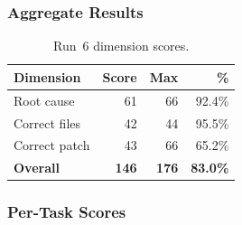 \subsubsection{Aggregate Results}

\begin{table}[h]
\centering
\caption{Run~6 dimension scores.}\label{tab:r6-dim}
\begin{tabular}{lrrr}
\toprule
\textbf{Dimension} & \textbf{Score} & \textbf{Max} & \textbf{\%} \\
\midrule
Root cause         & 61 & 66 & 92.4\% \\
Correct files      & 42 & 44 & 95.5\% \\
Correct patch      & 43 & 66 & 65.2\% \\
\midrule
\textbf{Overall}   & \textbf{146} & \textbf{176} & \textbf{83.0\%} \\
\bottomrule
\end{tabular}
\end{table}

\subsubsection{Per-Task Scores}

